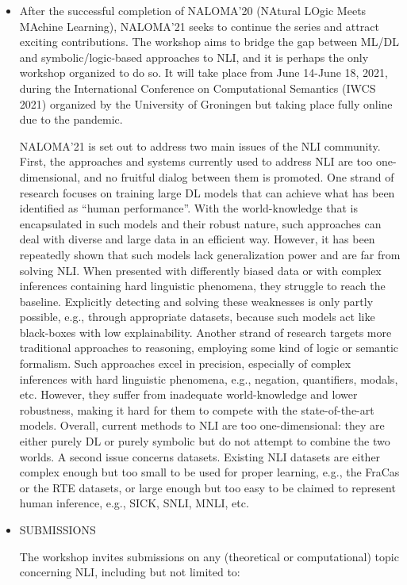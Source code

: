 \documentclass{article}
\begin{document}
\begin{itemize}\item   After the successful completion of NALOMA'20 (NAtural LOgic Meets MAchine Learning), NALOMA’21 seeks to continue the series and attract exciting contributions. The workshop aims to bridge the gap between ML/DL and symbolic/logic-based approaches to NLI, and it is perhaps the only workshop organized to do so. It will take place from June 14-June 18, 2021, during the International Conference on Computational Semantics (IWCS 2021) organized by the University of Groningen but taking place fully online due to the pandemic. 
 
  NALOMA'21 is set out to address two main issues of the NLI community. First, the approaches and systems currently used to address NLI are too one-dimensional, and no fruitful dialog between them is promoted. One strand of research focuses on training large DL models that can achieve what has been identified as ``human performance''. With the world-knowledge that is encapsulated in such models and their robust nature, such approaches can deal with diverse and large data in an efficient way. However, it has been repeatedly shown that such models lack generalization power and are far from solving NLI. When presented with differently biased data or with complex inferences containing hard linguistic phenomena, they struggle to reach the baseline. Explicitly detecting and solving these weaknesses is only partly possible, e.g., through appropriate datasets, because such models act like black-boxes with low explainability. Another strand of research targets more traditional approaches to reasoning, employing some kind of logic or semantic formalism. Such approaches excel in precision, especially of complex inferences with hard linguistic phenomena, e.g., negation, quantifiers, modals, etc. However, they suffer from inadequate world-knowledge and lower robustness, making it hard for them to compete with the state-of-the-art models. Overall, current methods to NLI are too one-dimensional: they are either purely DL or purely symbolic but do not attempt to combine the two worlds. A second issue concerns datasets. Existing NLI datasets are either complex enough but too small to be used for proper learning, e.g., the FraCas or the RTE datasets, or large enough but too easy to be claimed to represent human inference, e.g., SICK, SNLI, MNLI, etc. 
 
\item  SUBMISSIONS 
 
  The workshop invites submissions on any (theoretical or computational) topic concerning NLI, including but not limited to: 
 

\end{itemize}
\end{document}
